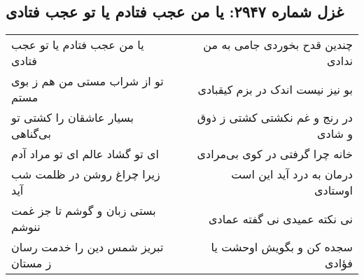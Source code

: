 \begin{center}
\section*{غزل شماره ۲۹۴۷: یا من عجب فتادم یا تو عجب فتادی}
\label{sec:2947}
\begin{longtable}{l p{0.5cm} r}
یا من عجب فتادم یا تو عجب فتادی
&&
چندین قدح بخوردی جامی به من ندادی
\\
تو از شراب مستی من هم ز بوی مستم
&&
بو نیز نیست اندک در بزم کیقبادی
\\
بسیار عاشقان را کشتی تو بی‌گناهی
&&
در رنج و غم نکشتی کشتی ز ذوق و شادی
\\
ای تو گشاد عالم ای تو مراد آدم
&&
خانه چرا گرفتی در کوی بی‌مرادی
\\
زیرا چراغ روشن در ظلمت شب آید
&&
درمان به درد آید این است اوستادی
\\
بستی زبان و گوشم تا جز غمت ننوشم
&&
نی نکته عمیدی نی گفته عمادی
\\
تبریز شمس دین را خدمت رسان ز مستان
&&
سجده کن و بگویش اوحشت یا فؤادی
\\
\end{longtable}
\end{center}

